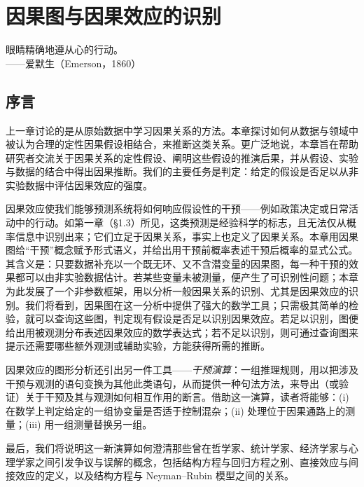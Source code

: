 \chapter{因果图与因果效应的识别}

\begin{flushright}
\kaishu\small
眼睛精确地遵从心的行动。\\[2pt]
——爱默生（Emerson，1860）
\end{flushright}

\section*{序言}

上一章讨论的是从原始数据中学习因果关系的方法。本章探讨如何从数据与领域中被认为合理的定性因果假设相结合，来推断这类关系。更广泛地说，本章旨在帮助研究者交流关于因果关系的定性假设、阐明这些假设的推演后果，并从假设、实验与数据的结合中得出因果推断。我们的主要任务是判定：给定的假设是否足以从非实验数据中评估因果效应的强度。

因果效应使我们能够预测系统将如何响应假设性的干预——例如政策决定或日常活动中的行动。如第一章（\S 1.3）所见，这类预测是经验科学的标志，且无法仅从概率信息中识别出来；它们立足于因果关系，事实上也定义了因果关系。本章用因果图给“干预”概念赋予形式语义，并给出用干预前概率表述干预后概率的显式公式。其含义是：只要数据补充以一个既无环、又不含潜变量的因果图，每一种干预的效果都可以由非实验数据估计。若某些变量未被测量，便产生了可识别性问题；本章为此发展了一个非参数框架，用以分析一般因果关系的识别、尤其是因果效应的识别。我们将看到，因果图在这一分析中提供了强大的数学工具；只需极其简单的检验，就可以查询这些图，判定现有假设是否足以识别因果效应。若足以识别，图便给出用被观测分布表述因果效应的数学表达式；若不足以识别，则可通过查询图来提示还需要哪些额外观测或辅助实验，方能获得所需的推断。

因果效应的图形分析还引出另一件工具——\emph{干预演算}：一组推理规则，用以把涉及干预与观测的语句变换为其他此类语句，从而提供一种句法方法，来导出（或验证）关于干预及其与观测如何相互作用的断言。借助这一演算，读者将能够：(i) 在数学上判定给定的一组协变量是否适于控制混杂；(ii) 处理位于因果通路上的测量；(iii) 用一组测量替换另一组。

最后，我们将说明这一新演算如何澄清那些曾在哲学家、统计学家、经济学家与心理学家之间引发争议与误解的概念，包括结构方程与回归方程之别、直接效应与间接效应的定义，以及结构方程与 Neyman–Rubin 模型之间的关系。

